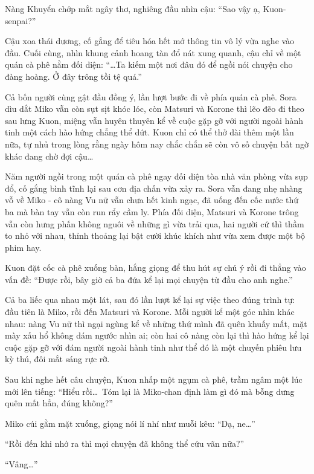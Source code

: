 \documentclass[../main.tex]{subfiles}
\begin{document}
Nàng Khuyển chớp mắt ngây thơ, nghiêng đầu nhìn cậu: ``Sao vậy ạ, Kuon-senpai?''

Cậu xoa thái dương, cố gắng để tiêu hóa hết mớ thông tin vô lý vừa nghe vào đầu. Cuối cùng, nhìn khung cảnh hoang tàn đổ nát xung quanh, cậu chỉ về một quán cà phê nằm đối diện: ``\dots Ta kiếm một nơi đâu đó để ngồi nói chuyện cho đàng hoàng. Ở đây trông tồi tệ quá.''

Cả bốn người cùng gật đầu đồng ý, lần lượt bước đi về phía quán cà phê. Sora dìu dắt Miko vẫn còn sụt sịt khóc lóc, còn Matsuri và Korone thì lẽo đẽo đi theo sau lưng Kuon, miệng vẫn huyên thuyên kể về cuộc gặp gỡ với người ngoài hành tinh một cách hào hứng chẳng thể dứt. Kuon chỉ có thể thở dài thêm một lần nữa, tự nhủ trong lòng rằng ngày hôm nay chắc chắn sẽ còn vô số chuyện bất ngờ khác đang chờ đợi cậu\dots

\ct

Năm người ngồi trong một quán cà phê ngay đối diện tòa nhà văn phòng vừa sụp đổ, cố gắng bình tĩnh lại sau cơn địa chấn vừa xảy ra. Sora vẫn đang nhẹ nhàng vỗ về Miko - cô nàng Vu nữ vẫn chưa hết kinh ngạc, đã uống đến cốc nước thứ ba mà bàn tay vẫn còn run rẩy cầm ly. Phía đối diện, Matsuri và Korone trông vẫn còn hưng phấn không nguôi về những gì vừa trải qua, hai người cứ thì thầm to nhỏ với nhau, thỉnh thoảng lại bật cười khúc khích như vừa xem được một bộ phim hay.

Kuon đặt cốc cà phê xuống bàn, hắng giọng để thu hút sự chú ý rồi đi thẳng vào vấn đề: ``Được rồi, bây giờ cả ba đứa kể lại mọi chuyện từ đầu cho anh nghe.''

Cả ba liếc qua nhau một lát, sau đó lần lượt kể lại sự việc theo đúng trình tự: đầu tiên là Miko, rồi đến Matsuri và Korone. Mỗi người kể một góc nhìn khác nhau: nàng Vu nữ thì ngại ngùng kể về những thứ mình đã quên khuấy mất, mặt mày xấu hổ không dám ngước nhìn ai; còn hai cô nàng còn lại thì hào hứng kể lại cuộc gặp gỡ với đám người ngoài hành tinh như thể đó là một chuyến phiêu lưu kỳ thú, đôi mắt sáng rực rỡ.

Sau khi nghe hết câu chuyện, Kuon nhấp một ngụm cà phê, trầm ngâm một lúc mới lên tiếng: ``Hiểu rồi\dots\ Tóm lại là Miko-chan định làm gì đó mà bỗng dưng quên mất hẳn, đúng không?''

Miko cúi gằm mặt xuống, giọng nói lí nhí như muỗi kêu: ``Dạ, ne\dots''

``Rồi đến khi nhớ ra thì mọi chuyện đã không thể cứu vãn nữa?''

``Vâng\dots''
\end{document}
